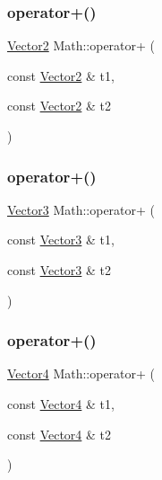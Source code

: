\mbox{\label{namespace_math_a62f686c8f0b005ab24cd368fe4ab1b4b}} 
\subsubsection{\texorpdfstring{operator+()}{operator+()}\hspace{0.1cm}{\footnotesize\ttfamily [1/6]}}
{\footnotesize\ttfamily \mbox{\hyperlink{struct_math_1_1_vector2}{Vector2}} Math\+::operator+ (\begin{DoxyParamCaption}\item[{const \mbox{\hyperlink{struct_math_1_1_vector2}{Vector2}} \&}]{t1,  }\item[{const \mbox{\hyperlink{struct_math_1_1_vector2}{Vector2}} \&}]{t2 }\end{DoxyParamCaption})}

\mbox{\label{namespace_math_a279c2ff1375f08332e47f665f9d96622}} 
\subsubsection{\texorpdfstring{operator+()}{operator+()}\hspace{0.1cm}{\footnotesize\ttfamily [2/6]}}
{\footnotesize\ttfamily \mbox{\hyperlink{struct_math_1_1_vector3}{Vector3}} Math\+::operator+ (\begin{DoxyParamCaption}\item[{const \mbox{\hyperlink{struct_math_1_1_vector3}{Vector3}} \&}]{t1,  }\item[{const \mbox{\hyperlink{struct_math_1_1_vector3}{Vector3}} \&}]{t2 }\end{DoxyParamCaption})}

\mbox{\label{namespace_math_a62a5770bc56d8813435b7530021278b5}} 
\subsubsection{\texorpdfstring{operator+()}{operator+()}\hspace{0.1cm}{\footnotesize\ttfamily [3/6]}}
{\footnotesize\ttfamily \mbox{\hyperlink{struct_math_1_1_vector4}{Vector4}} Math\+::operator+ (\begin{DoxyParamCaption}\item[{const \mbox{\hyperlink{struct_math_1_1_vector4}{Vector4}} \&}]{t1,  }\item[{const \mbox{\hyperlink{struct_math_1_1_vector4}{Vector4}} \&}]{t2 }\end{DoxyParamCaption})}

